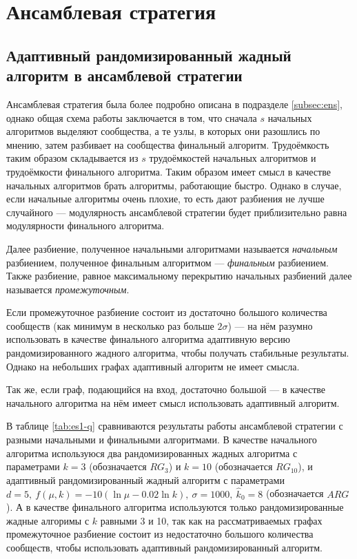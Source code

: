 
\section{Ансамблевая стратегия}



\subsection{Адаптивный рандомизированный жадный алгоритм в ансамблевой стратегии}

Ансамблевая стратегия была более подробно описана в подразделе \ref{subsec:ens}, однако общая схема работы заключается в том, что сначала $s$ начальных алгоритмов выделяют  сообщества, а те узлы, в которых они разошлись по мнению, затем разбивает на сообщества финальный алгоритм. Трудоёмкость таким образом складывается из $s$ трудоёмкостей начальных алгоритмов и трудоёмкости финального алгоритма. Таким образом имеет смысл в качестве начальных алгоритмов брать алгоритмы, работающие быстро. Однако в случае, если начальные алгоритмы очень плохие, то есть дают разбиения не лучше случайного --- модулярность ансамблевой стратегии будет приблизительно равна модулярности финального алгоритма. 

Далее разбиение, полученное начальными алгоритмами называется \emph{начальным} разбиением, полученное финальным алгоритмом --- \emph{финальным} разбиением. Также  разбиение, равное максимальному перекрытию начальных разбиений далее называется \emph{промежуточным}.

Если промежуточное разбиение состоит из достаточно большого количества сообществ (как минимум в несколько раз больше $2\sigma$) --- на нём разумно использовать в качестве финального алгоритма адаптивную версию рандомизированного жадного алгоритма, чтобы получать стабильные результаты. Однако на небольших графах адаптивный алгоритм не имеет смысла.

Так же, если граф, подающийся на вход, достаточно большой --- в качестве начального алгоритма на нём имеет смысл использовать адаптивный алгоритм.

В таблице \ref{tab:es1-q} сравниваются результаты работы ансамблевой стратегии с разными начальными и финальными алгоритмами. В качестве начального алгоритма используюся два рандомизированных жадных алгоритма с параметрами $k = 3$ (обозначается $RG_3$) и $k = 10$ (обозначается $RG_{10}$), и адаптивный рандомизированный жадный алгоритм с параметрами $d = 5,\ f(\mu, k) = -10(\ln \mu - 0.02 \ln k),\ \sigma = 1000,\ \hat{k}_0 = 8$ (обозначается $ARG$). А в качестве финального алгоритма используются только рандомизированные жадные алгоримы с $k$ равными 3 и 10, так как на рассматриваемых графах промежуточное разбиение состоит из недостаточно большого количества сообществ, чтобы использовать адаптивный рандомизированный алгоритм.

